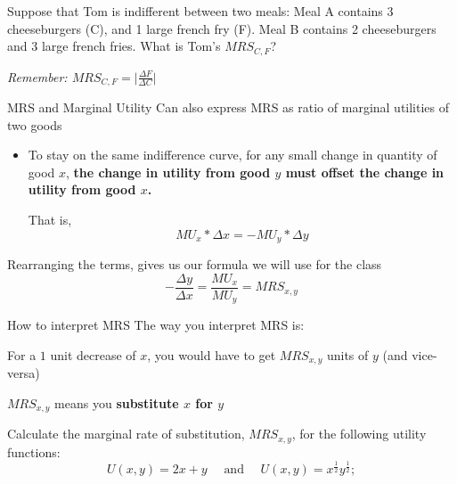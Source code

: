 \documentclass[12pt,t]{beamer}
\begin{document}
\begin{frame}

  \bigskip
  Suppose that Tom is indifferent between two meals: Meal A contains 3 cheeseburgers (C), and 1 large french fry (F). Meal B contains 2 cheeseburgers and 3 large french fries. What is Tom's $MRS_{C,F}$?

  \emph{Remember: $MRS_{C,F} = \vert \frac{\Delta F}{\Delta C} \vert$}
\end{frame}

\begin{frame}{MRS and Marginal Utility}
  Can also express MRS as ratio of marginal utilities of two goods
  \begin{itemize}
    \item To stay on the same indifference curve, for any small change in quantity of good $x$, \textbf{the change in utility from good $y$ must offset the change in utility from good $x$.}
    
    That is, 
    $$
      MU_x * \Delta x = - MU_y * \Delta y
    $$ 
  \end{itemize}
  
  \pause\bigskip
  Rearranging the terms, gives us our formula we will use for the class 
  $$
    -\frac{\Delta y}{\Delta x} = \frac{MU_x}{MU_y} = MRS_{x,y}
  $$
\end{frame}

\begin{frame}{How to interpret MRS}
  The way you interpret MRS is: 
  
  \bigskip
  For a $1$ unit decrease of $x$, you would have to get $MRS_{x,y}$ units of $y$ (and vice-versa)
  

  \pause\bigskip
  $MRS_{x,y}$ means you \textbf{substitute $x$ for $y$}
\end{frame}

\begin{frame}

  \bigskip
  Calculate the marginal rate of substitution, $MRS_{x,y}$, for the following utility functions:
  $$
    U(x,y) = 2x + y \quad\text{ and }\quad U(x,y) = x^{\frac{1}{2}} y^{\frac{1}{2}};
  $$
\end{frame}
\end{document}
